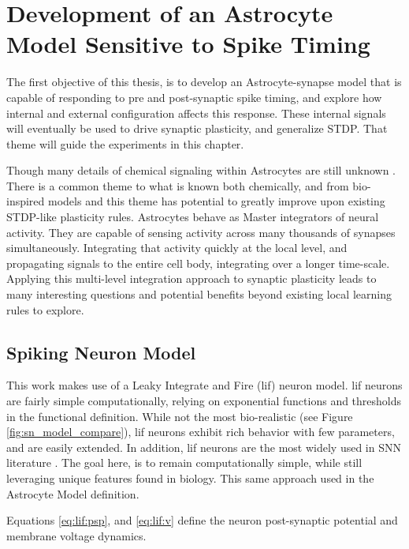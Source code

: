 %

\chapter{Development of an Astrocyte Model Sensitive to Spike Timing} \label{chapter:obj1}
The first objective of this thesis, is to develop an Astrocyte-synapse model
that is capable of responding to pre and post-synaptic spike timing, and
explore how internal and external configuration affects this response. These
internal signals will eventually be used to drive synaptic plasticity, and
generalize STDP. That theme will guide the experiments in this chapter.

Though many details of chemical signaling within Astrocytes are still unknown
\cite{manninen_2018}. There is a common theme to what is known both chemically,
and from bio-inspired models and this theme has potential to greatly improve upon
existing STDP-like plasticity rules. Astrocytes behave as Master integrators of
neural activity. They are capable of sensing activity across many thousands of
synapses simultaneously. Integrating that activity quickly at the local level,
and propagating signals to the entire cell body, integrating over a longer
time-scale. Applying this multi-level integration approach to synaptic
plasticity leads to many interesting questions and potential benefits beyond
existing local learning rules to explore.

\section{Spiking Neuron Model}
This work makes use of a Leaky Integrate and Fire (\Gls{lif}) neuron model. \Gls{lif}
neurons are fairly simple computationally, relying on exponential functions
and thresholds in the functional definition. While not the most
bio-realistic (see Figure \ref{fig:sn_model_compare}), \Gls{lif} neurons exhibit
rich behavior with few parameters, and are easily extended. In addition, \Gls{lif}
neurons are the most widely used in SNN literature \cite{ponulak_2011}. The
goal here, is to remain computationally simple, while still leveraging unique
features found in biology. This same approach used in the Astrocyte Model
definition.

Equations \ref{eq:lif:psp}, and \ref{eq:lif:v} define the neuron post-synaptic
potential and membrane voltage dynamics.

